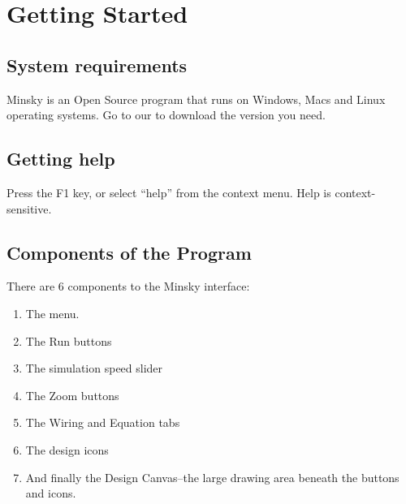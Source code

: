 \chapter{Getting Started}

\section{System requirements}

Minsky is an Open Source program that runs on Windows, Macs and Linux
operating systems. Go to our  to download the version you need.

\section{Getting help}

Press the F1 key, or select ``help'' from the context menu. Help is
context-sensitive.


\section{Components of the Program}

There are 6 components to the Minsky interface:

\begin{enumerate}
\item  The menu.


\item  The Run buttons


\item The simulation speed slider


\item The Zoom buttons


\item The Wiring and Equation tabs


\item The design icons



\item And finally the Design Canvas--the large drawing area beneath the buttons and icons.

\end{enumerate}

